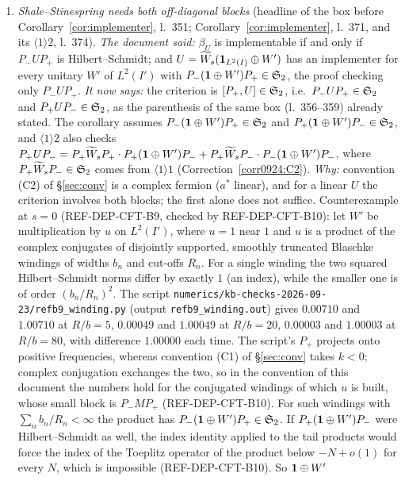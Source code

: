 \documentclass[11pt]{article}
\newcommand{\Pp}{P_+}\newcommand{\Pm}{P_-}
\newcommand{\Wt}{\widetilde W}\newcommand{\kt}{\widetilde k}
\begin{document}
\begin{enumerate}[label=(C\arabic*),ref=C\arabic*,leftmargin=3em]
\item\label{corr0924:C1} \emph{Shale--Stinespring needs both off-diagonal blocks} (headline of the
 box before Corollary~\ref{cor:implementer}, l.~351; Corollary~\ref{cor:implementer}, l.~371, and
 its $\langle1\rangle2$, l.~374).
 \emph{The document said:} $\beta_U$ is implementable if and only if $\Pm U\Pp$ is Hilbert--Schmidt;
 and $U=\Wt_s(\one_{L^2(I)}\oplus W')$ has an implementer for every unitary $W'$ of $L^2(I')$ with
 $\Pm(\one\oplus W')\Pp\in\Stwo$, the proof checking only $\Pm U\Pp$.
 \emph{It now says:} the criterion is $[\Pp,U]\in\Stwo$, i.e.\ $\Pm U\Pp\in\Stwo$ and
 $\Pp U\Pm\in\Stwo$, as the parenthesis of the same box (l.~356--359) already stated.  The corollary
 assumes $\Pm(\one\oplus W')\Pp\in\Stwo$ and $\Pp(\one\oplus W')\Pm\in\Stwo$, and $\langle1\rangle2$
 also checks $\Pp U\Pm=\Pp\Wt_s\Pp\cdot\Pp(\one\oplus W')\Pm+\Pp\Wt_s\Pm\cdot\Pm(\one\oplus W')\Pm$,
 where $\Pp\Wt_s\Pm\in\Stwo$ comes from $\langle1\rangle1$ (Correction~\ref{corr0924:C2}).
 \emph{Why:} convention (C2) of \S\ref{sec:conv} is a complex fermion ($a^*$ linear), and for a linear $U$ the criterion involves
 both blocks; the first alone does not suffice.  Counterexample at $s=0$ (REF-DEP-CFT-B9, checked by
 REF-DEP-CFT-B10): let $W'$ be multiplication by $u$ on $L^2(I')$, where $u=1$ near $1$ and $u$ is a
 product of the complex conjugates of disjointly supported, smoothly truncated Blaschke windings of
 widths $b_n$ and cut-offs $R_n$.  For a single winding the two squared Hilbert--Schmidt norms differ by exactly $1$ (an
 index), while the smaller one is of order $(b_n/R_n)^2$.  The script
 \texttt{numerics/kb-checks-2026-09-23/refb9\_winding.py} (output \texttt{refb9\_winding.out}) gives
 $0.00710$ and $1.00710$ at $R/b=5$, $0.00049$ and $1.00049$ at $R/b=20$, $0.00003$ and $1.00003$ at
 $R/b=80$, with difference $1.00000$ each time.  The script's $\Pp$ projects onto positive
 frequencies, whereas convention (C1) of \S\ref{sec:conv} takes $k<0$; complex conjugation exchanges the two, so in the convention
 of this document the numbers hold for the conjugated windings of which $u$ is built, whose small
 block is $\Pm M\Pp$ (REF-DEP-CFT-B10).  For such windings with $\sum_nb_n/R_n<\infty$ the product has
 $\Pm(\one\oplus W')\Pp\in\Stwo$.  If $\Pp(\one\oplus W')\Pm$ were Hilbert--Schmidt as well, the
 index identity applied to the tail products would force the index of the Toeplitz operator of the
 product below $-N+o(1)$ for every $N$, which is impossible (REF-DEP-CFT-B10).  So $\mathbf 1\oplus W'$

\end{enumerate}
\end{document}
